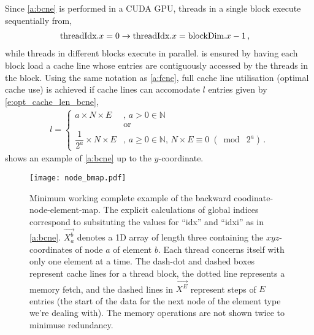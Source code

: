 	
	Since \cref{a:bcne} is performed in a CUDA GPU, threads in a single block execute sequentially from,
	\begin{align}
		\textrm{threadIdx}.x &= 0 \to \textrm{threadIdx}.x = \textrm{blockDim}.x - 1\,,
	\end{align}
	while threads in different blocks execute in parallel.  is ensured by having each block load a cache line whose entries are contiguously accessed by the threads in the block. Using the same notation as \cref{a:fcne}, full cache line utilisation (optimal cache use) is achieved if cache lines can accomodate $ l $ entries given by \cref{e:opt_cache_len_bcne},
	\begin{align}
		\label{e:opt_cache_len_bcne}
		l =
		\begin{cases}
			a \times N \times E &,\, a > 0 \in \mathbb{N}\\
			&\textrm{or}\\
			\dfrac{1}{2^{a}} \times N \times E &,\, a \geq 0 \in \mathbb{N},\, N \times E \equiv 0\; (\bmod\; 2^{a})\,.
		\end{cases}
	\end{align}
	 shows an example of \cref{a:bcne} up to the $ y $-coordinate.
	\begin{figure}
		\centering
		\texttt{[image: node\_bmap.pdf]}
		\caption[Example of the backward coodinate-node-element-map.]{Minimum working complete example of the backward coodinate-node-element-map. The explicit calculations of global indices correspond to subsituting the values for ``idx'' and ``idxi'' as in \cref{a:bcne}. $\vec{X_{a}^{b}}$ denotes a 1D array of length three containing the $ xyz $-coordinates of node $ a $ of element $ b $. Each thread concerns itself with only one element at a time. The dash-dot and dashed boxes represent cache lines for a thread block, the dotted line represents a memory fetch, and the dashed lines in $ \vec{X^{E}} $ represent steps of $ E $ entries (the start of the data for the next node of the element type we're dealing with). The memory operations are not shown twice to minimuse redundancy.}
		\label{f:fcne_eg}
	\end{figure}
